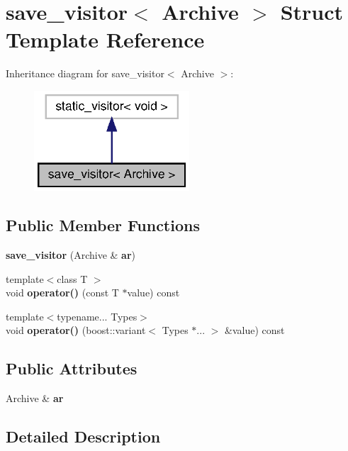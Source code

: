 \section{save\+\_\+visitor$<$ Archive $>$ Struct Template Reference}
\label{structcereal_1_1save__visitor}


Inheritance diagram for save\+\_\+visitor$<$ Archive $>$\+:
\nopagebreak
\begin{figure}[H]
\begin{center}
\leavevmode
\includegraphics[width=164pt]{structcereal_1_1save__visitor__inherit__graph}
\end{center}
\end{figure}
\subsection*{Public Member Functions}
\begin{DoxyCompactItemize}
\item 
\textbf{ save\+\_\+visitor} (Archive \&\textbf{ ar})
\item 
{\footnotesize template$<$class T $>$ }\\void \textbf{ operator()} (const T $\ast$value) const
\item 
{\footnotesize template$<$typename... Types$>$ }\\void \textbf{ operator()} (boost\+::variant$<$ Types $\ast$... $>$ \&value) const
\end{DoxyCompactItemize}
\subsection*{Public Attributes}
\begin{DoxyCompactItemize}
\item 
Archive \& \textbf{ ar}
\end{DoxyCompactItemize}


\subsection{Detailed Description}
